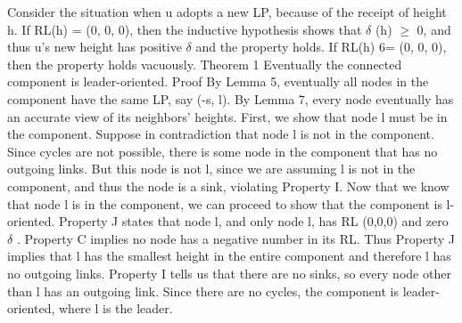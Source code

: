 Consider the situation when u adopts a new LP, because of the receipt of height h. If RL(h) = (0, 0, 0), then the inductive hypothesis shows that $\delta$ (h) $\geq$ 0, and thus u’s new height has positive $\delta$ and the property holds. If RL(h) 6= (0, 0, 0), then the property holds vacuously. Theorem 1 Eventually the connected component is leader-oriented.
Proof By Lemma 5, eventually all nodes in the component have the same LP, say (-s, l). By Lemma 7, every node eventually has an accurate view of its neighbors’ heights. First, we show that node l must be in the component. Suppose in contradiction that node l is not in the component. Since cycles are not possible, there is some node in the component that has no outgoing links. But this node is not l, since we are assuming l is not in the component, and thus the node is a sink, violating Property I. Now that we know that node l is in the component, we can proceed to show that the component is l-oriented. Property J states that node l, and only node l, has RL (0,0,0) and zero $\delta$ . Property C implies no node has a negative number in its RL. Thus Property J implies that l has the smallest height in the entire component and therefore l has no outgoing links. Property I tells us that there are no sinks, so every node other than l has an outgoing link. Since there are no cycles, the component is leader-oriented, where l is the leader.